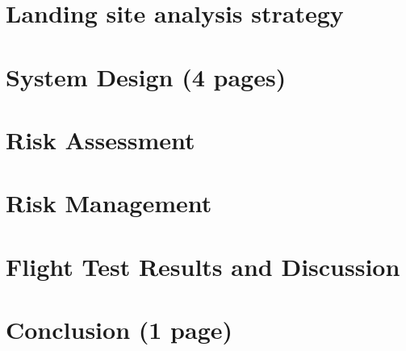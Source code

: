 \documentclass{article}
\begin{document}
\clearpage
\section{Landing site analysis strategy}


\clearpage
\section{System Design (4 pages)}


\clearpage
\section{Risk Assessment}


\clearpage
\section{Risk Management}


\clearpage
\section{Flight Test Results and Discussion}


\clearpage
\section{Conclusion (1 page)}

\end{document}
